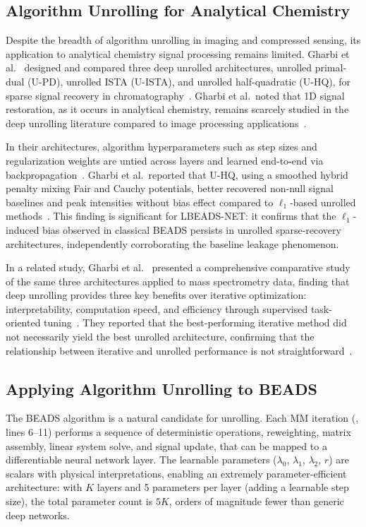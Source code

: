 \subsection{Algorithm Unrolling for Analytical Chemistry}

Despite the breadth of algorithm unrolling in imaging and compressed sensing, its application to analytical chemistry signal processing remains limited. Gharbi et al.~\cite{gharbi2024unrolled} designed and compared three deep unrolled architectures, unrolled primal-dual (U-PD), unrolled ISTA (U-ISTA), and unrolled half-quadratic (U-HQ), for sparse signal recovery in chromatography~\cite{gharbi2024unrolled}. Gharbi et al.\ noted that 1D signal restoration, as it occurs in analytical chemistry, remains scarcely studied in the deep unrolling literature compared to image processing applications~\cite{gharbi2024unrolled}.

In their architectures, algorithm hyperparameters such as step sizes and regularization weights are untied across layers and learned end-to-end via backpropagation~\cite{gharbi2024unrolled}. Gharbi et al.\ reported that U-HQ, using a smoothed hybrid penalty mixing Fair and Cauchy potentials, better recovered non-null signal baselines and peak intensities without bias effect compared to $\ell_1$-based unrolled methods~\cite{gharbi2024unrolled}. This finding is significant for LBEADS-NET: it confirms that the $\ell_1$-induced bias observed in classical BEADS persists in unrolled sparse-recovery architectures, independently corroborating the baseline leakage phenomenon.

In a related study, Gharbi et al.~\cite{gharbi2023unrolled_sparse} presented a comprehensive comparative study of the same three architectures applied to mass spectrometry data, finding that deep unrolling provides three key benefits over iterative optimization: interpretability, computation speed, and efficiency through supervised task-oriented tuning~\cite{gharbi2023unrolled_sparse}. They reported that the best-performing iterative method did not necessarily yield the best unrolled architecture, confirming that the relationship between iterative and unrolled performance is not straightforward~\cite{gharbi2023unrolled_sparse}.

\subsection{Applying Algorithm Unrolling to BEADS}

The BEADS algorithm is a natural candidate for unrolling. Each MM iteration (, lines 6--11) performs a sequence of deterministic operations, reweighting, matrix assembly, linear system solve, and signal update, that can be mapped to a differentiable neural network layer. The learnable parameters ($\lambda_0$, $\lambda_1$, $\lambda_2$, $r$) are scalars with physical interpretations, enabling an extremely parameter-efficient architecture: with $K$ layers and 5 parameters per layer (adding a learnable step size), the total parameter count is $5K$, orders of magnitude fewer than generic deep networks.

